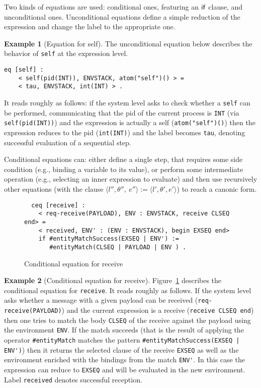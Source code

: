 \documentclass{article}[12pt,a4paper]
\theoremstyle{definition}
\newtheorem{example}{Example}[section]
\begin{document}
Two kinds of equations are used: conditional ones, featuring an
$\mathsf{if}$ clause, and unconditional ones. Unconditional equations
define a simple reduction of the expression and change the label to
the appropriate one.

\begin{example}[Equation for self]
The unconditional equation below describes the behavior of \verb+self+ at the expression level.
\begin{verbatim}
eq [self] :
    < self(pid(INT)), ENVSTACK, atom("self")() > =
    < tau, ENVSTACK, int(INT) > .
\end{verbatim}
It reads roughly as follows: if the system level asks to check whether a \verb+self+ can be performed, communicating that the pid of the current process is \verb+INT+ (via \verb+self(pid(INT))+) and the expression is actually a self (\verb+atom("self")()+) then the expression reduces to the pid (\verb+int(INT)+) and the label becomes \verb+tau+, denoting successful evaluation of a sequential step.
\end{example}

Conditional equations can: either define a single step, that requires
some side condition (e.g., binding a variable to its value), or
perform some intermediate operation (e.g., selecting an inner
expression to evaluate) and then use recursively other equations (with the clause $\langle
    l'',\theta'',~e'' \rangle := \langle l',\theta',e'\rangle$) to
reach a canonic form.

\begin{figure}[t]
  \centering
\begin{verbatim}
  ceq [receive] :
    < req-receive(PAYLOAD), ENV : ENVSTACK, receive CLSEQ end> =
    < received, ENV' : (ENV : ENVSTACK), begin EXSEQ end>
    if #entityMatchSuccess(EXSEQ | ENV') := 
       #entityMatch(CLSEQ | PAYLOAD | ENV ) .
\end{verbatim}
  \caption{Conditional equation for receive}
  \label{fig:eq-rec}
\end{figure}

\begin{example}[Conditional equation for receive]\label{ex:eqrec}
Figure~\ref{fig:eq-rec} describes the conditional equation for
\verb+receive+. It reads roughly as follows. If the system level asks whether
a message with a given payload can be received
(\verb+req-receive(PAYLOAD)+) and the current expression is a receive
(\verb+receive CLSEQ end+) then one tries to match the body
\verb+CLSEQ+ of the receive against the payload using the environment \verb+ENV+. If the match succeeds (that is the result of applying the operator \verb+#entityMatch+ matches the pattern \verb+#entityMatchSuccess(EXSEQ | ENV')+) then it returns the selected clause of the receive \verb+EXSEQ+ as well as the environment enriched with the bindings from the match
 \verb+ENV'+. In this case the expression can reduce to \verb+EXSEQ+ and will be evaluated in the new environment. Label \verb+received+ denotes successful reception.
\end{example}
\end{document}
